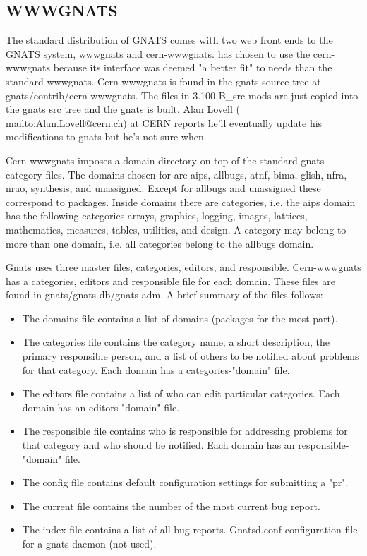 \subsection{WWWGNATS}
The standard distribution of GNATS comes with two web front ends to the GNATS
system, wwwgnats and cern-wwwgnats. \aips has chosen to use the cern-wwwgnats
because its interface was deemed "a better fit" to \aips needs than the standard
wwwgnats.
Cern-wwwgnats is found in the gnats source tree at
gnats/contrib/cern-wwwgnats.  The files in
3.100-B\_src-mods are just copied into the gnats src tree and the gnats is
built.  Alan Lovell (
{mailto:Alan.Lovell@cern.ch}) at CERN reports he'll eventually update his
modifications to gnats but he's not sure when.

Cern-wwwgnats imposes a domain directory on top of the standard gnats category
files. The domains chosen for \aips are aips, allbugs, atnf, bima, glish,
nfra, nrao, synthesis, and unassigned.  Except for allbugs and unassigned these
correspond to \aips packages.  Inside domains there are categories, i.e.
the aips domain has the following categories arrays, graphics, logging, 
images, lattices, mathematics, measures, tables, utilities, and design.
A category may belong to more than one domain, i.e. all categories belong to
the allbugs domain.

Gnats uses three master
files, categories, editors, and responsible.  Cern-wwwgnats has a categories, 
editors and responsible file for each domain.
These files are found in gnats/gnats-db/gnats-adm.  A brief summary of the
files follows:
\begin{itemize}
\item The domains file contains a list of \aips domains (packages for the
most part).

\item The categories file
contains the category name, a short description, the primary responsible
person, and a list of others to be notified about problems for that category.
Each domain has a categories-"domain" file.

\item The editors file contains a list of who can edit
particular categories. Each domain has an editors-"domain" file.

\item The responsible file contains who is responsible
for addressing problems for that category and who should be notified.
Each domain has an responsible-"domain" file.

\item The config file contains default configuration settings for submitting a "pr".

\item The current file contains the number of the most current bug report.

\item The index file contains a list of all bug reports.
Gnatsd.conf configuration file for a gnats daemon (not used).
\end{itemize}

